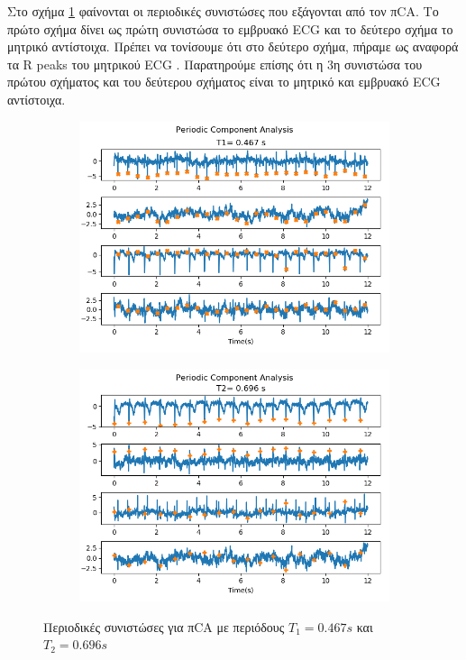 %
\noindent Στο σχήμα \ref{fig:5.24} φαίνονται οι περιοδικές συνιστώσες που εξάγονται από τον π\en CA. \gr Το πρώτο σχήμα δίνει ως πρώτη συνιστώσα το εμβρυακό \en ECG \gr και το δεύτερο σχήμα το μητρικό αντίστοιχα. Πρέπει να τονίσουμε ότι στο δεύτερο σχήμα, πήραμε ως αναφορά τα \en R peaks \en του μητρικού \en ECG \gr. Παρατηρούμε επίσης ότι η 3η συνιστώσα του πρώτου σχήματος και του δεύτερου σχήματος είναι το μητρικό και εμβρυακό \en ECG \gr αντίστοιχα.
\begin{figure}[H] 
    \centering
    \begin{subfigure}{0.48 \textwidth}
        \centering
        \includegraphics[width=\textwidth]{r01database/infant_pica.png}\en
    \end{subfigure}
    \hfill
    \begin{subfigure}{0.48 \textwidth}
        \centering
        \includegraphics[width=\textwidth]{r01database/mother_pica.png}\en
    \end{subfigure}
    \gr
    \caption{Περιοδικές συνιστώσες για π\en CA \gr με περιόδους \en $Τ_1 = 0.467 s$ \gr και \en $Τ_2 = 0.696 s$ \gr  }
    \label{fig:5.24}
\end{figure} 
